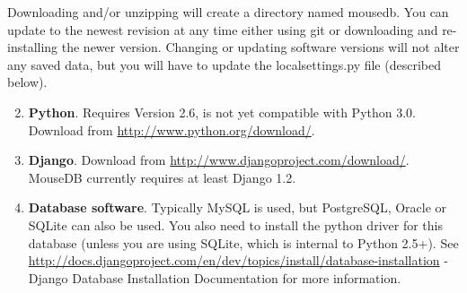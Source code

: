 \documentclass[letterpaper,10pt,english]{sphinxmanual}
\begin{document}
Downloading and/or unzipping will create a directory named mousedb.  You can update to the newest revision at any time either using git or downloading and re-installing the newer version.  Changing or updating software versions will not alter any saved data, but you will have to update the localsettings.py file (described below).
\begin{enumerate}
\setcounter{enumi}{1}
\item {} 
\textbf{Python}.  Requires Version 2.6, is not yet compatible with Python 3.0.  Download from \href{http://www.python.org/download/}{http://www.python.org/download/}.

\item {} 
\textbf{Django}.  Download from \href{http://www.djangoproject.com/download/}{http://www.djangoproject.com/download/}.  MouseDB currently requires at least Django 1.2.

\item {} 
\textbf{Database software}.  Typically MySQL is used, but PostgreSQL, Oracle or SQLite can also be used.  You also need to install the python driver for this database (unless you are using SQLite, which is internal to Python 2.5+).  See \href{http://docs.djangoproject.com/en/dev/topics/install/database-installation}{http://docs.djangoproject.com/en/dev/topics/install/database-installation} - Django Database Installation Documentation for more information.

\end{enumerate}
\end{document}
